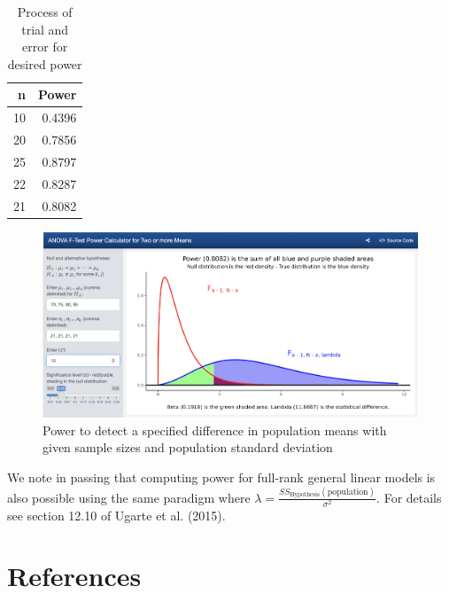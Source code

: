 \documentclass[
]{article}
\begin{document}
\begin{table}

\caption{\label{tab:unnamed-chunk-2}Process of trial and error for desired power}
\centering
\begin{tabular}[t]{rr}
\toprule
n & Power\\
\midrule
10 & 0.4396\\
20 & 0.7856\\
25 & 0.8797\\
22 & 0.8287\\
21 & 0.8082\\
\bottomrule
\end{tabular}
\end{table}

\begin{figure}

{\centering \includegraphics[width=7.35in]{./pics/fig-power4b} 

}

\caption{Power to detect a specified difference in population means with given sample sizes and population standard deviation}\label{fig:power4}
\end{figure}

We note in passing that computing power for full-rank general linear models is also possible using the same paradigm where \(\lambda = \frac{SS_\text{Hypothesis}(\text{population})}{\sigma^2}\). For details see section 12.10 of Ugarte et al. (2015).

\section*{References}\label{references}
\end{document}
